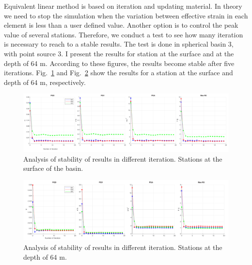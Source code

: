 Equivalent linear method is based on iteration and updating material. In theory we need to stop the simulation when the variation between effective strain in each element is less than a user defined value. Another option is to control the peak value of several stations. Therefore, we conduct a test to see how many iteration is necessary to reach to a stable results. The test is done in spherical basin 3, with point source 3. I present the results for station at the surface and at the depth of 64 m. According to these figures, the results become stable after five iterations. Fig.~\ref{fig:iteration_surface} and Fig.~\ref{fig:iteration_deep_64}  show the results for a station at the surface and depth of 64 m, respectively.


\begin{figure}[H]
    \centering
    \includegraphics[width=\textwidth]{figures/pdf/iteration_surface.pdf}
    \caption{Analysis of stability of results in different iteration. Stations at the surface of the basin.}
    \label{fig:iteration_surface}
\end{figure}


\begin{figure}[H]
    \centering
    \includegraphics[width=\textwidth]{figures/pdf/iteration_deep_64.pdf}
    \caption{Analysis of stability of results in different iteration. Stations at the depth of 64 m.}
    \label{fig:iteration_deep_64}
\end{figure}


